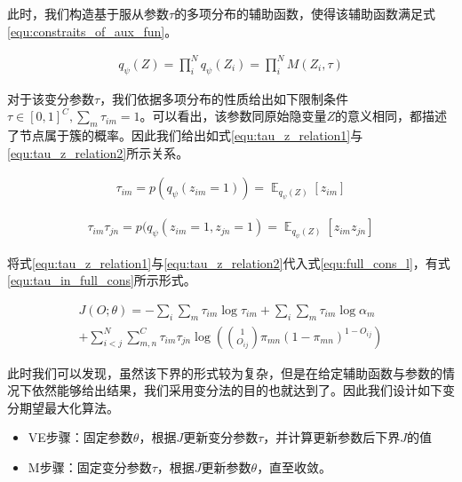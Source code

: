 此时，我们构造基于服从参数$\tau$的多项分布的辅助函数，使得该辅助函数满足式\ref{equ:constraits_of_aux_fun}。

\begin{equation}\label{equ:constraits_of_aux_fun}
  \begin{aligned}
q_\psi(Z)=\prod_i^N q_\psi(Z_i)=\prod_i^N M(Z_i,\tau)
\end{aligned}\end{equation}

对于该变分参数$\tau$，我们依据多项分布的性质给出如下限制条件$\tau \in [0,1]^C,\sum_m \tau_{im} =1$。可以看出，该参数同原始隐变量$Z$的意义相同，都描述了节点属于簇的概率。因此我们给出如式\ref{equ:tau_z_relation1}与\ref{equ:tau_z_relation2}所示关系。

\begin{equation}\label{equ:tau_z_relation1}
  \begin{aligned}
\tau_{im}=p(q_\psi(z_{im}=1))=\mathop{\mathbb{E}}_{q_\psi(Z)}[z_{im}]
\end{aligned}\end{equation}

\begin{equation}\label{equ:tau_z_relation2}
  \begin{aligned}
\tau_{im}\tau_{jn}=p(q_\psi(z_{im}=1,z_{jn}=1) =\mathop{\mathbb{E}}_{q_\psi(Z)}[z_{im}z_{jn}]
\end{aligned}\end{equation}

将式\ref{equ:tau_z_relation1}与\ref{equ:tau_z_relation2}代入式\ref{equ:full_cons_l}，有式\ref{equ:tau_in_full_cons}所示形式。

\begin{equation}\label{equ:tau_in_full_cons}
  \begin{aligned}
J(O;\theta)=-\sum_i\sum_m\tau_{im} \log \tau_{im} +\sum_i\sum_m \tau_{im} \log \alpha_m \\+\sum_{i<j}^N\sum_{m,n}^C\tau_{im}\tau_{jn}\log ( \binom{1}{O_{ij}}\pi_{mn}(1-\pi_{mn})^{1-O_{ij}})
\end{aligned}\end{equation}

此时我们可以发现，虽然该下界的形式较为复杂，但是在给定辅助函数与参数的情况下依然能够给出结果，我们采用变分法的目的也就达到了。因此我们设计如下变分期望最大化算法。

\begin{itemize}
    \item VE步骤：固定参数$\theta$，根据$J$更新变分参数$\tau$，并计算更新参数后下界$J$的值
    \item M步骤：固定变分参数$\tau$，根据$J$更新参数$\theta$，直至收敛。
\end{itemize}

